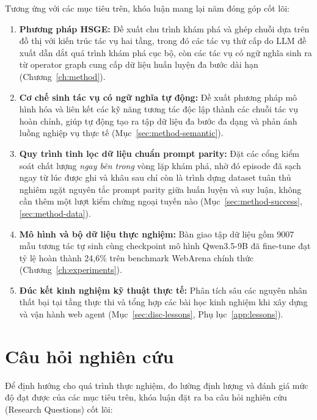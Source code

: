 Tương ứng với các mục tiêu trên, khóa luận mang lại năm đóng góp cốt lõi:
\begin{enumerate}
  \item \textbf{Phương pháp HSGE:} Đề xuất chu trình khám phá và ghép chuỗi dựa trên đồ thị với kiến trúc tác vụ hai tầng, trong đó các tác vụ thứ cấp do LLM đề xuất dẫn dắt quá trình khám phá cục bộ, còn các tác vụ có ngữ nghĩa sinh ra từ operator graph cung cấp dữ liệu huấn luyện đa bước dài hạn (Chương~\ref{ch:method}).
  \item \textbf{Cơ chế sinh tác vụ có ngữ nghĩa tự động:} Đề xuất phương pháp mô hình hóa và liên kết các kỹ năng tương tác độc lập thành các chuỗi tác vụ hoàn chỉnh, giúp tự động tạo ra tập dữ liệu đa bước đa dạng và phản ánh luồng nghiệp vụ thực tế (Mục~\ref{sec:method-semantic}).
  \item \textbf{Quy trình tinh lọc dữ liệu chuẩn prompt parity:} Đặt các cổng kiểm soát chất lượng \emph{ngay bên trong} vòng lặp khám phá, nhờ đó episode đã sạch ngay từ lúc được ghi và khâu sau chỉ còn là trình dựng dataset tuân thủ nghiêm ngặt nguyên tắc prompt parity giữa huấn luyện và suy luận, không cần thêm một lượt kiểm chứng ngoại tuyến nào (Mục~\ref{sec:method-success}, \ref{sec:method-data}).
  \item \textbf{Mô hình và bộ dữ liệu thực nghiệm:} Bàn giao tập dữ liệu gồm 9007 mẫu tương tác tự sinh cùng checkpoint mô hình Qwen3.5-9B đã fine-tune đạt tỷ lệ hoàn thành 24,6\% trên benchmark WebArena chính thức (Chương~\ref{ch:experiments}).
  \item \textbf{Đúc kết kinh nghiệm kỹ thuật thực tế:} Phân tích sâu các nguyên nhân thất bại tại tầng thực thi và tổng hợp các bài học kinh nghiệm khi xây dựng và vận hành web agent (Mục~\ref{sec:disc-lessons}, Phụ lục~\ref{app:lessons}).
\end{enumerate}
\section{Câu hỏi nghiên cứu}
\label{sec:intro-rq}

Để định hướng cho quá trình thực nghiệm, đo lường định lượng và đánh giá mức độ đạt được của các mục tiêu trên, khóa luận đặt ra ba câu hỏi nghiên cứu (Research Questions) cốt lõi:

